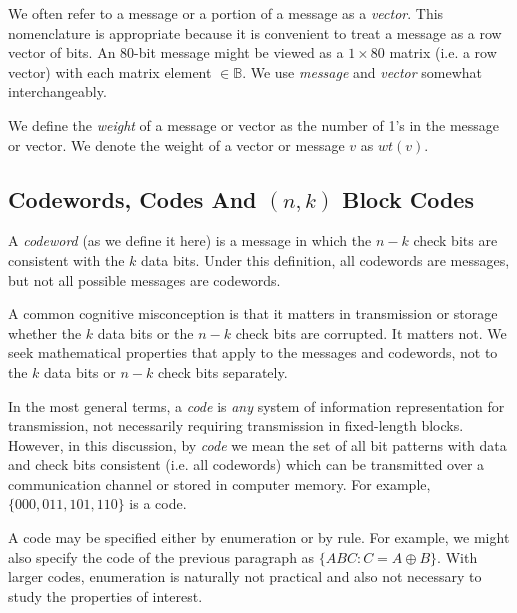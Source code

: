 We often refer to a message or a portion of a message as a 
\emph{vector}.  This nomenclature is appropriate because it is
convenient to treat a message as a row vector of bits.  
An 80-bit message might
be viewed as a $1 \times 80$ matrix (i.e. a row vector) with each matrix element
$\in \mathbb{B}$.  We use \emph{message} and \emph{vector} somewhat interchangeably.

We define the \emph{weight} of a message or vector as the number of 
1's in the message or vector.  We denote the weight of a vector or message $v$ as
$wt(v)$.


\subsection[Codewords, Codes, And \protect\mbox{\protect$(n,k)$} Block Codes]
           {Codewords, Codes And \protect\mbox{\protect\boldmath$(n,k)$} Block Codes}
\label{cedc0:scon0:scco0}

A \emph{codeword} (as we define it here) is a message in which 
the $n-k$ check bits are consistent with the $k$ data bits.
Under this definition, all codewords are messages, but not all possible messages
are codewords.

A common cognitive misconception is that it matters in transmission or
storage whether the $k$ data bits or the $n-k$ check bits are corrupted.
It matters not.  We seek mathematical properties that apply to the messages 
and codewords, not to the $k$ data bits or $n-k$ check bits separately.

In the most general terms, a \emph{code} is \emph{any} system
of information representation for transmission, not necessarily requiring 
transmission in fixed-length blocks.  However, in this discussion, by
\emph{code} we mean the set of all bit 
patterns with data and check bits consistent (i.e. all codewords)
which can be transmitted over a communication channel or stored
in computer memory.  For example,
$\{000, 011, 101, 110\}$ is a code.

A code may be specified either by enumeration or by rule.  For example,
we might also specify the code of the previous paragraph as 
$\{ABC: C=A \oplus B\}$.  With larger codes, enumeration is naturally not practical and
also not necessary to study the properties of interest.

